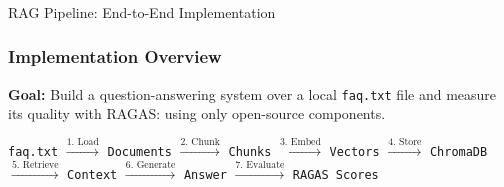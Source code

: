 %

\begin{frame}[fragile]\frametitle{}
\begin{center}
{\Large RAG Pipeline: End-to-End Implementation}
\end{center}
\end{frame}


\begin{frame}[fragile]\frametitle{Implementation Overview}

\textbf{Goal:} Build a question-answering system over a local \texttt{faq.txt} file and measure its quality with RAGAS: using only open-source components.

\vspace{0.4em}
\begin{center}
\small
\texttt{faq.txt}
$\xrightarrow{\text{1. Load}}$
\texttt{Documents}
$\xrightarrow{\text{2. Chunk}}$
\texttt{Chunks}
$\xrightarrow{\text{3. Embed}}$
\texttt{Vectors}
$\xrightarrow{\text{4. Store}}$
\texttt{ChromaDB}
$\xrightarrow{\text{5. Retrieve}}$
\texttt{Context}
$\xrightarrow{\text{6. Generate}}$
\texttt{Answer}
$\xrightarrow{\text{7. Evaluate}}$
\texttt{RAGAS Scores}
\end{center}


\end{frame}



